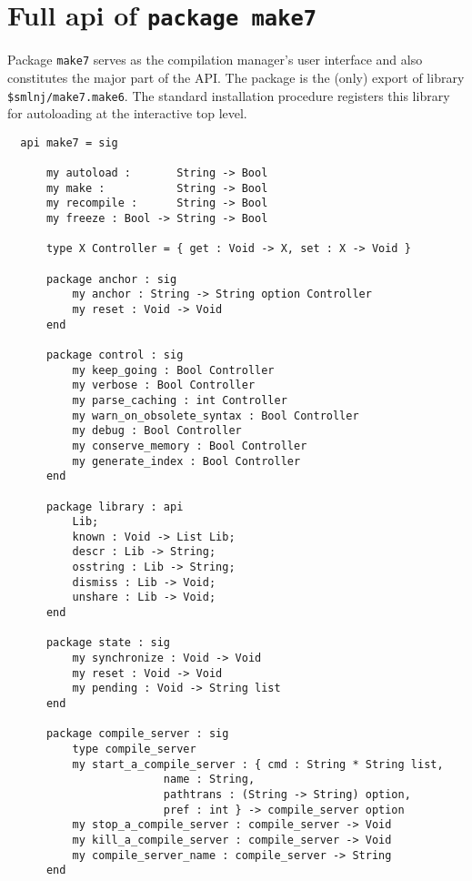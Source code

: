 
\section{Full api of {\tt package make7}}

Package {\tt make7} serves as the compilation manager's user interface
and also constitutes the major part of the API.  The package is the
(only) export of library {\tt \$smlnj/make7.make6}.  The standard
installation procedure registers this library for
autoloading at the interactive top level.

\begin{small}
\begin{verbatim}
  api make7 = sig

      my autoload :       String -> Bool
      my make :           String -> Bool
      my recompile :      String -> Bool
      my freeze : Bool -> String -> Bool

      type X Controller = { get : Void -> X, set : X -> Void }

      package anchor : sig
          my anchor : String -> String option Controller
          my reset : Void -> Void
      end

      package control : sig
          my keep_going : Bool Controller
          my verbose : Bool Controller
          my parse_caching : int Controller
          my warn_on_obsolete_syntax : Bool Controller
          my debug : Bool Controller
          my conserve_memory : Bool Controller
          my generate_index : Bool Controller
      end

      package library : api
          Lib;
          known : Void -> List Lib;
          descr : Lib -> String;
          osstring : Lib -> String;
          dismiss : Lib -> Void;
          unshare : Lib -> Void;
      end

      package state : sig
          my synchronize : Void -> Void
          my reset : Void -> Void
          my pending : Void -> String list
      end

      package compile_server : sig
          type compile_server
          my start_a_compile_server : { cmd : String * String list,
                        name : String,
                        pathtrans : (String -> String) option,
                        pref : int } -> compile_server option
          my stop_a_compile_server : compile_server -> Void
          my kill_a_compile_server : compile_server -> Void
          my compile_server_name : compile_server -> String
      end


\end{verbatim}
\end{small}
